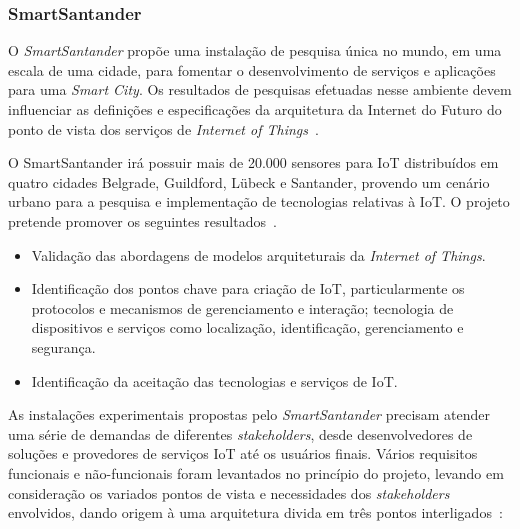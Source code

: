 \subsubsection{SmartSantander}
O \textit{SmartSantander} propõe uma instalação de pesquisa única no mundo, em uma escala de uma cidade,
para fomentar o desenvolvimento de serviços e aplicações para uma \textit{Smart City}.
Os resultados de pesquisas efetuadas nesse ambiente devem influenciar as definições e especificações da arquitetura da
Internet do Futuro do ponto de vista dos serviços de \textit{Internet of Things}~\cite{citeulike:13508566}.

O SmartSantander irá possuir mais de 20.000 sensores para IoT distribuídos em quatro cidades Belgrade,
Guildford, Lübeck e Santander, provendo um cenário urbano para a pesquisa e implementação de tecnologias relativas
à IoT.
O projeto pretende promover os seguintes resultados~\cite{smartsantandersite}.
\begin{itemize}
\item Validação das abordagens de modelos arquiteturais da \textit{Internet of Things}.
\item Identificação dos pontos chave para criação de IoT, particularmente os protocolos e mecanismos de gerenciamento e
interação; tecnologia de dispositivos e serviços como localização, identificação, gerenciamento e segurança.
\item Identificação da aceitação das tecnologias e serviços de IoT.
\end{itemize}

As instalações experimentais propostas pelo \textit{SmartSantander} precisam atender uma série de demandas
de diferentes \textit{stakeholders}, desde desenvolvedores de soluções e provedores de serviços IoT até os usuários finais.
Vários requisitos funcionais e não-funcionais foram levantados no princípio do projeto, levando em consideração
os variados pontos de vista e necessidades dos \textit{stakeholders} envolvidos, dando origem à uma arquitetura divida
em três pontos interligados~\cite{smartsantander_testbeds}:

